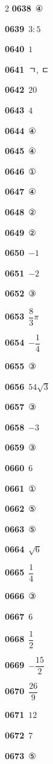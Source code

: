 \documentclass[10pt,a4paper]{article}
\begin{document}
\begin{multicols}{2}
\noindent\textbf{0638}\ ④\par
\noindent\textbf{0639}\ $3:5$\par
\noindent\textbf{0640}\ $1$\par
\noindent\textbf{0641}\ ㄱ, ㄷ\par
\noindent\textbf{0642}\ $20$\par
\noindent\textbf{0643}\ $4$\par
\noindent\textbf{0644}\ ④\par
\noindent\textbf{0645}\ ④\par
\noindent\textbf{0646}\ ①\par
\noindent\textbf{0647}\ ④\par
\noindent\textbf{0648}\ ②\par
\noindent\textbf{0649}\ ②\par
\noindent\textbf{0650}\ $-1$\par
\noindent\textbf{0651}\ $-2$\par
\noindent\textbf{0652}\ ③\par
\noindent\textbf{0653}\ $\dfrac{8}{3}\pi$\par
\noindent\textbf{0654}\ $-\dfrac{1}{4}$\par
\noindent\textbf{0655}\ ③\par
\noindent\textbf{0656}\ $54\sqrt{3}$\par
\noindent\textbf{0657}\ ③\par
\noindent\textbf{0658}\ $-3$\par
\noindent\textbf{0659}\ ③\par
\noindent\textbf{0660}\ $6$\par
\noindent\textbf{0661}\ ①\par
\noindent\textbf{0662}\ ⑤\par
\noindent\textbf{0663}\ ⑤\par
\noindent\textbf{0664}\ $\sqrt{6}$\par
\noindent\textbf{0665}\ $\dfrac{1}{4}$\par
\noindent\textbf{0666}\ ③\par
\noindent\textbf{0667}\ $6$\par
\noindent\textbf{0668}\ $\dfrac{1}{2}$\par
\noindent\textbf{0669}\ $-\dfrac{15}{2}$\par
\noindent\textbf{0670}\ $\dfrac{26}{9}$\par
\noindent\textbf{0671}\ $12$\par
\noindent\textbf{0672}\ $7$\par
\noindent\textbf{0673}\ ⑤\par

\end{multicols}
\end{document}
